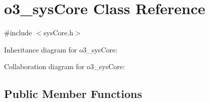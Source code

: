 \hypertarget{classo3__sysCore}{
\section{o3\_\-sysCore Class Reference}
\label{classo3__sysCore}
}


{\ttfamily \#include $<$sysCore.h$>$}



Inheritance diagram for o3\_\-sysCore:


Collaboration diagram for o3\_\-sysCore:
\subsection*{Public Member Functions}
\begin{DoxyCompactItemize}
\item 

\end{DoxyCompactItemize}
